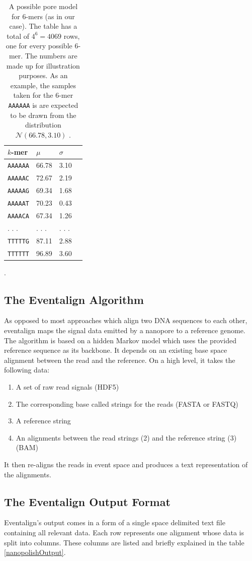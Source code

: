 \documentclass[times, utf, seminar]{fer}
\begin{document}
\begin{table}
	\centering
	\begin{tabular}{l l l l}
		$k$-mer & $\mu$ & $\sigma$  \\	
		\hline{}
		\texttt{AAAAAA} & 66.78 & 3.10  \\
		\texttt{AAAAAC} & 72.67 & 2.19 \\
		\texttt{AAAAAG} & 69.34 & 1.68 \\
		\texttt{AAAAAT} & 70.23 & 0.43 \\
		\texttt{AAAACA} & 67.34 & 1.26 \\
		. . .  & . . . & . . .  \\
		\texttt{TTTTTG} & 87.11 & 2.88 \\
		\texttt{TTTTTT} & 96.89 & 3.60 \\
	\end{tabular}
	\caption{A possible pore model for $6$-mers (as in our case). The table has a total of $4^6 = 4069$ rows, one for every possible $6$-mer. The numbers are made up for illustration purposes. As an example, the samples taken for the $6$-mer \texttt{AAAAAA} is are expected to be drawn from the distribution $\mathcal{N}(66.78, 3.10)$ \citep{simpson}.}.
	\label{poreModel}
\end{table}

\subsection{The Eventalign Algorithm}
As opposed to most approaches which align two DNA sequences to each other, eventalign maps 
the signal data emitted by a nanopore to a reference genome. The algorithm is based on a hidden Markov model which uses the provided reference sequence as its backbone. It depends on an existing base space alignment between the read and the reference. On a high level, it takes the following data:
\begin{enumerate}
	\item A set of raw read signals (HDF5)
	\item The corresponding base called strings for the reads (FASTA or FASTQ)
	\item A reference string
	\item An alignments between the read strings (2) and the reference string (3) (BAM)
\end{enumerate}
It then re-aligns the reads in event space and produces a text representation of the alignments.
\subsection{The Eventalign Output Format}
Eventalign's output comes in a form of a single space delimited text file containing all relevant data. Each row represents one alignment whose data is split into columns. These columns are listed and briefly explained in the table \ref{nanopolishOutput}.
\end{document}
